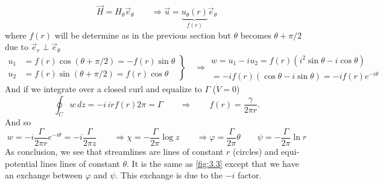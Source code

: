 		\begin{equation}
			\vec{H} = H_\theta \vec{e}_\theta \qquad \Rightarrow \vec{u} = \underbrace{u_\theta (r)}_{f(r)} \vec{e}_\theta
		\end{equation}
		where $f(r)$ will be determine as in the previous section but $\theta$ becomes $\theta +\pi /2$ due to $\vec{e}_r \perp \vec{e}_\theta$
		\begin{equation}
		\left.
			\begin{aligned}
			u_1 &= f(r) \cos (\theta +\pi /2) = -f(r)\sin \theta \\
			u_2 &= f(r) \sin (\theta +\pi /2) = f(r) \cos \theta
			\end{aligned}
			\right\}
			\quad \Rightarrow 
			\begin{aligned}
			w = u_1 - iu_2 = f(r) (i^2 \sin \theta - i \cos \theta)\\
				= -i f(r) (\cos \theta - i \sin \theta )= -i f(r) e^{-i\theta}
			\end{aligned}
		\end{equation}
		And if we integrate over a closed curl and equalize to $\Gamma$ ($\dot{V}=0$) 
		\begin{equation}
			\oint _C w\, dz = -i\, ir f(r)2\pi = \Gamma \qquad \Rightarrow \qquad f(r) = \frac{\gamma}{2\pi r}.
		\end{equation}
		And so 
		\begin{equation}
			w = -i \frac{\Gamma}{2\pi r}e^{-i\theta} = -i \frac{\Gamma}{2\pi z} \qquad \Rightarrow \chi = -\frac{\Gamma}{2\pi}\log z \qquad \Rightarrow \varphi = \frac{\Gamma}{2\pi} \theta \qquad \psi = -\frac{\Gamma}{2\pi}\ln r
		\end{equation}
		As conclusion, we see that streamlines are lines of constant $r$ (circles) and equi-potential lines lines of constant $\theta$. It is the same as \autoref{fig:3.3} except that we have an exchange between $\varphi$ and $\psi$. This exchange is due to the $-i$ factor. 
		
		\newpage
		
